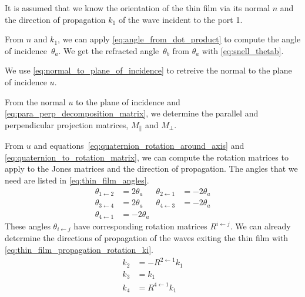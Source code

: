 It is assumed that we know the orientation of the thin film via its normal $n$ and the direction of propagation $k_1$ of the wave incident to the port 1.

From $n$ and $k_1$, we can apply \cref{eq:angle_from_dot_product} to compute the angle of incidence~$\theta_a$.
We get the refracted angle~$\theta_b$ from $\theta_a$ with \cref{eq:snell_thetab}.

We use \cref{eq:normal_to_plane_of_incidence} to retreive the normal to the plane of incidence $u$.

From the normal $u$ to the plane of incidence
and \cref{eq:para_perp_decomposition_matrix},
we determine the parallel and perpendicular projection matrices,
$M_\parallel$ and $M_\perp$.

From $u$ and
equations~\eqref{eq:quaternion_rotation_around_axis}
and \eqref{eq:quaternion_to_rotation_matrix}, we can compute the rotation matrices to apply to the Jones matrices and the direction of propagation.
The angles that we need are listed in \cref{eq:thin_film_angles}.
\begin{equation}
    \begin{aligned}
        \theta_{1 \leftarrow 2} &= 2 \theta_a
        &
        \theta_{2 \leftarrow 1} &= -2 \theta_a
        \\
        \theta_{3 \leftarrow 4} &= 2 \theta_a
        &
        \theta_{4 \leftarrow 3} &= -2 \theta_a
        \\
        \theta_{4 \leftarrow 1} &= -2 \theta_a
    \end{aligned}
    \label{eq:thin_film_angles}
\end{equation}
These angles $\theta_{i \leftarrow j}$ have corresponding rotation matrices $R^{i \leftarrow j}$.
We can already determine the directions of propagation of the waves exiting the thin film with \cref{eq:thin_film_propagation_rotation_ki}.
\begin{subequations}
    \begin{align}
        k_2 &= -R^{2 \leftarrow 1} k_1
        \label{eq:thin_film_propagation_rotation_k2}\\
        k_3 &= k_1
        \label{eq:thin_film_propagation_rotation_k3}\\
        k_4 &= R^{4 \leftarrow 1} k_1
        \label{eq:thin_film_propagation_rotation_k4}
    \end{align}
    \label{eq:thin_film_propagation_rotation_ki}
\end{subequations}

